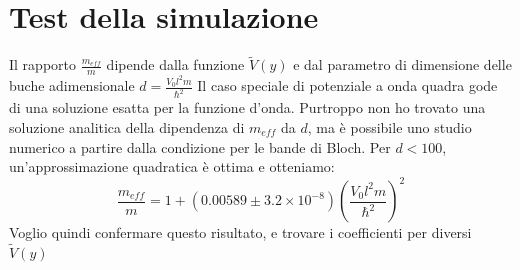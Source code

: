 \documentclass[italian]{article}
\begin{document}
\section{Test della simulazione}
    
    Il rapporto $\frac{m_{eff}}{m}$ dipende dalla funzione $\tilde{V}(y)$ e dal parametro di dimensione delle buche adimensionale $d = \frac{V_0 l^2 m}{\hbar^2}$
    Il caso speciale di potenziale a onda quadra gode di una soluzione esatta per la funzione d'onda. Purtroppo non ho trovato una soluzione analitica della dipendenza di $m_{eff}$ da $d$, ma è possibile uno studio numerico a partire dalla condizione per le bande di Bloch.
    Per $d < 100$, un'approssimazione quadratica è ottima e otteniamo:
    \begin{equation}
        \frac{m_{eff}}{m} = 1 + \left(0.00589 \pm 3.2 \times 10^{-8}\right)\left(\frac{V_0 l^2 m}{\hbar^2}\right)^2
    \end{equation}
    Voglio quindi confermare questo risultato, e trovare i coefficienti per diversi $\tilde{V}(y)$
    
\end{document}
